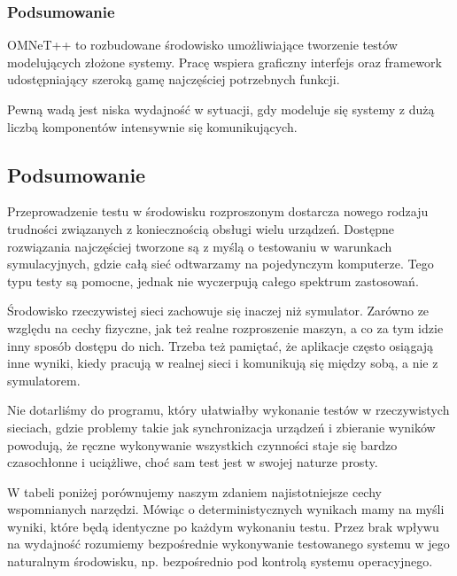\documentclass[00-praca-magisterska.tex]{subfiles}
\begin{document}
\subsubsection{Podsumowanie}

OMNeT++ to rozbudowane środowisko umożliwiające tworzenie testów modelujących
złożone systemy. Pracę wspiera graficzny interfejs oraz framework
udostępniający szeroką gamę najczęściej potrzebnych funkcji.

Pewną wadą jest niska wydajność w sytuacji, gdy modeluje się systemy z dużą
liczbą komponentów intensywnie się komunikujących.

\subsection{Podsumowanie}

Przeprowadzenie testu w środowisku rozproszonym dostarcza nowego rodzaju
trudności związanych z koniecznością obsługi wielu urządzeń. Dostępne
rozwiązania najczęściej tworzone są z myślą o testowaniu w warunkach
symulacyjnych, gdzie całą sieć odtwarzamy na pojedynczym komputerze. Tego typu
testy są pomocne, jednak nie wyczerpują całego spektrum zastosowań.

Środowisko rzeczywistej sieci zachowuje się inaczej niż symulator. Zarówno ze
względu na cechy fizyczne, jak też realne rozproszenie maszyn, a co za tym
idzie inny sposób dostępu do nich. Trzeba też pamiętać, że aplikacje często
osiągają inne wyniki, kiedy pracują w realnej sieci i komunikują się między
sobą, a nie z symulatorem.

Nie dotarliśmy do programu, który ułatwiałby wykonanie testów w
rzeczywistych sieciach, gdzie problemy takie jak synchronizacja urządzeń i
zbieranie wyników powodują, że ręczne wykonywanie wszystkich czynności staje
się bardzo czasochłonne i uciążliwe, choć sam test jest w swojej naturze prosty.

W tabeli poniżej porównujemy naszym zdaniem najistotniejsze cechy wspomnianych
narzędzi. Mówiąc o deterministycznych wynikach mamy na myśli wyniki, które będą
identyczne po każdym wykonaniu testu. Przez brak wpływu na wydajność rozumiemy
bezpośrednie wykonywanie testowanego systemu w jego naturalnym środowisku, np.
bezpośrednio pod kontrolą systemu operacyjnego.
\end{document}
